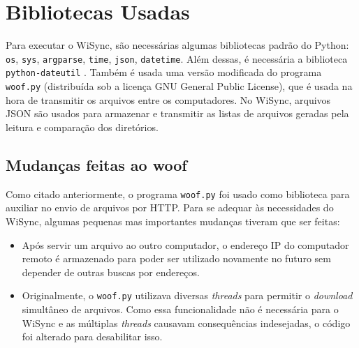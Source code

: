 \documentclass[12pt,a4paper]{ufpr}
\begin{document}
\section{Bibliotecas Usadas}
Para executar o WiSync, são necessárias algumas bibliotecas padrão do Python: \texttt{os}, \texttt{sys}, \texttt{argparse}, \texttt{time}, \texttt{json}, \texttt{datetime}.
Além dessas, é necessária a biblioteca \texttt{python-dateutil} \cite{python-dateutil}.
Também é usada uma versão modificada do programa \texttt{woof.py} \cite{woof} (distribuída sob a licença GNU General Public License), que é usada na hora de transmitir os arquivos entre os computadores.
No WiSync, arquivos JSON são usados para armazenar e transmitir as listas de arquivos geradas pela leitura e comparação dos diretórios.

\subsection{Mudanças feitas ao woof}
Como citado anteriormente, o programa \texttt{woof.py} \cite{woof} foi usado como biblioteca para auxiliar no envio de arquivos por HTTP.
Para se adequar às necessidades do WiSync, algumas pequenas mas importantes mudanças tiveram que ser feitas:
\begin{itemize}
  \item Após servir um arquivo ao outro computador, o endereço IP do computador remoto é armazenado para poder ser utilizado novamente no futuro sem depender de outras buscas por endereços.
  \item Originalmente, o \texttt{woof.py} utilizava diversas \textit{threads} para permitir o \textit{download} simultâneo de arquivos. Como essa funcionalidade não é necessária para o WiSync e as múltiplas \textit{threads} causavam consequências indesejadas, o código foi alterado para desabilitar isso.
\end{itemize}
\end{document}

